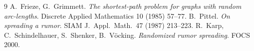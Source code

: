 \documentclass[11pt]{article}
\begin{document}
\begin{thebibliography}{9}
 A.~Frieze, G.~Grimmett.
\emph{The shortest-path problem for graphs with random arc-lengths}.
Discrete Applied Mathematics 10 (1985) 57--77.
 B.~Pittel.
\emph{On spreading a rumor}. SIAM J.\ Appl.\ Math.\ 47 (1987) 213--223.
 R.~Karp, C.~Schindelhauer, S.~Shenker, B.~V\"ocking.
\emph{Randomized rumor spreading}. FOCS 2000.
\end{thebibliography}
\end{document}
